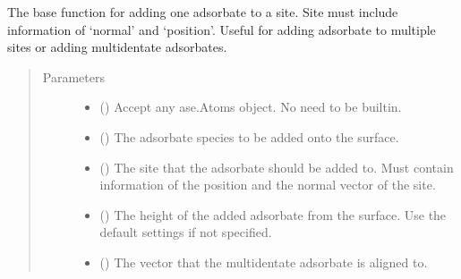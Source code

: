 \documentclass[letterpaper,10pt,english]{sphinxmanual}
\begin{document}
\begin{fulllineitems}
\label{\detokenize{build:acat.build.actions.add_adsorbate_to_site}}
The base function for adding one adsorbate to a site.
Site must include information of ‘normal’ and ‘position’.
Useful for adding adsorbate to multiple sites or adding
multidentate adsorbates.
\begin{quote}\begin{description}
\item[{Parameters}] \leavevmode\begin{itemize}
\item {} 
 () \textendash{} Accept any ase.Atoms object. No need to be built\sphinxhyphen{}in.

\item {} 
 () \textendash{} The adsorbate species to be added onto the surface.

\item {} 
 () \textendash{} The site that the adsorbate should be added to.
Must contain information of the position and the
normal vector of the site.

\item {} 
 (\sphinxstyleliteralemphasis{\sphinxupquote{, }}) \textendash{} The height of the added adsorbate from the surface.
Use the default settings if not specified.

\item {} 
 (\sphinxstyleliteralemphasis{\sphinxupquote{, }}) \textendash{} The vector that the multidentate adsorbate is aligned to.


\end{itemize}
\end{description}
\end{quote}
\end{fulllineitems}
\end{document}
